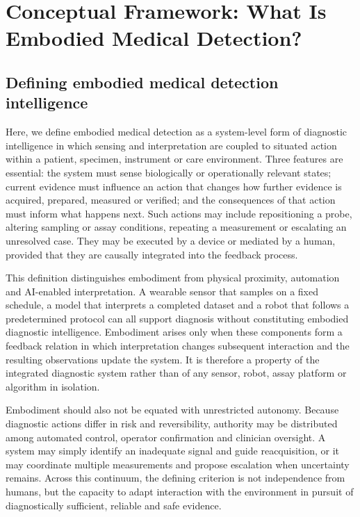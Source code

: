 \documentclass[12pt,a4paper]{article}
\begin{document}
\section{Conceptual Framework: What Is Embodied Medical Detection?}
\label{sec:conceptual_framework}

\subsection{Defining embodied medical detection intelligence}
\label{subsec:defining_embodied_medical_detection}
Here, we define embodied medical detection as a system-level form of diagnostic intelligence in which sensing and interpretation are coupled to situated action within a patient, specimen, instrument or care environment. Three features are essential: the system must sense biologically or operationally relevant states; current evidence must influence an action that changes how further evidence is acquired, prepared, measured or verified; and the consequences of that action must inform what happens next. Such actions may include repositioning a probe, altering sampling or assay conditions, repeating a measurement or escalating an unresolved case. They may be executed by a device or mediated by a human, provided that they are causally integrated into the feedback process.

This definition distinguishes embodiment from physical proximity, automation and AI-enabled interpretation. A wearable sensor that samples on a fixed schedule, a model that interprets a completed dataset and a robot that follows a predetermined protocol can all support diagnosis without constituting embodied diagnostic intelligence. Embodiment arises only when these components form a feedback relation in which interpretation changes subsequent interaction and the resulting observations update the system. It is therefore a property of the integrated diagnostic system rather than of any sensor, robot, assay platform or algorithm in isolation.

Embodiment should also not be equated with unrestricted autonomy. Because diagnostic actions differ in risk and reversibility, authority may be distributed among automated control, operator confirmation and clinician oversight. A system may simply identify an inadequate signal and guide reacquisition, or it may coordinate multiple measurements and propose escalation when uncertainty remains. Across this continuum, the defining criterion is not independence from humans, but the capacity to adapt interaction with the environment in pursuit of diagnostically sufficient, reliable and safe evidence.
\end{document}
